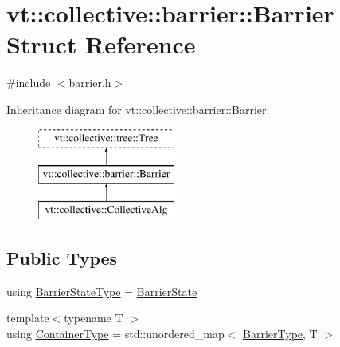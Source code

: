 \hypertarget{structvt_1_1collective_1_1barrier_1_1_barrier}{}\section{vt\+:\+:collective\+:\+:barrier\+:\+:Barrier Struct Reference}
\label{structvt_1_1collective_1_1barrier_1_1_barrier}


{\ttfamily \#include $<$barrier.\+h$>$}

Inheritance diagram for vt\+:\+:collective\+:\+:barrier\+:\+:Barrier\+:\begin{figure}[H]
\begin{center}
\leavevmode
\includegraphics[height=3.000000cm]{structvt_1_1collective_1_1barrier_1_1_barrier}
\end{center}
\end{figure}
\subsection*{Public Types}
\begin{DoxyCompactItemize}
\item 
using \hyperlink{structvt_1_1collective_1_1barrier_1_1_barrier_a9b612818f7b44ca65f2caee0dee094f3}{Barrier\+State\+Type} = \hyperlink{structvt_1_1collective_1_1barrier_1_1_barrier_state}{Barrier\+State}
\item 
{\footnotesize template$<$typename T $>$ }\\using \hyperlink{structvt_1_1collective_1_1barrier_1_1_barrier_a84bfbd26a48a1c3bb7272e81245e4873}{Container\+Type} = std\+::unordered\+\_\+map$<$ \hyperlink{namespacevt_a25e481f0d6bbc7204db23d1c87a62e77}{Barrier\+Type}, T $>$
\end{DoxyCompactItemize}
